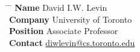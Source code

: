 \documentclass[10pt]{article} %
\begin{document}
\noindent\parbox{0.5\textwidth}{
\begin{tabbing}
\hspace{2.75cm} \= \hspace{4cm} \= \kill
{\bf Name} \> David I.W. Levin\\ 
{\bf Company} \> University of Toronto\\ 
{\bf Position} \>Associate Professor \\ 
{\bf Contact} \> \href{mailto:diwlevin@cs.toronto.edu}{diwlevin@cs.toronto.edu}
\end{tabbing}}


\end{document}

